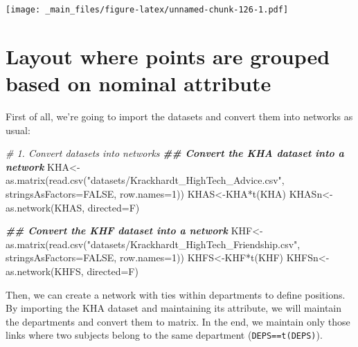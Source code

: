 \documentclass[
  notitlepage,
  onecolumn,
  openany]{book}
\newenvironment{Shaded}{\begin{snugshade}}{\end{snugshade}}
\newcommand{\AttributeTok}[1]{\textcolor[rgb]{0.77,0.63,0.00}{#1}}
\newcommand{\CommentTok}[1]{\textcolor[rgb]{0.56,0.35,0.01}{\textit{#1}}}
\newcommand{\ConstantTok}[1]{\textcolor[rgb]{0.00,0.00,0.00}{#1}}
\newcommand{\DecValTok}[1]{\textcolor[rgb]{0.00,0.00,0.81}{#1}}
\newcommand{\DocumentationTok}[1]{\textcolor[rgb]{0.56,0.35,0.01}{\textbf{\textit{#1}}}}
\newcommand{\FunctionTok}[1]{\textcolor[rgb]{0.00,0.00,0.00}{#1}}
\newcommand{\NormalTok}[1]{#1}
\newcommand{\OtherTok}[1]{\textcolor[rgb]{0.56,0.35,0.01}{#1}}
\newcommand{\SpecialCharTok}[1]{\textcolor[rgb]{0.00,0.00,0.00}{#1}}
\newcommand{\StringTok}[1]{\textcolor[rgb]{0.31,0.60,0.02}{#1}}
\begin{document}
\texttt{[image: \_main\_files/figure-latex/unnamed-chunk-126-1.pdf]}

\hypertarget{layout-where-points-are-grouped-based-on-nominal-attribute}{%
\section{Layout where points are grouped based on nominal attribute}\label{layout-where-points-are-grouped-based-on-nominal-attribute}}

First of all, we're going to import the datasets and convert them into networks as usual:

\begin{Shaded}
\begin{Highlighting}[]
\CommentTok{\# 1. Convert datasets into networks}
\DocumentationTok{\#\# Convert the KHA dataset into a network}
\NormalTok{KHA}\OtherTok{\textless{}{-}}\FunctionTok{as.matrix}\NormalTok{(}\FunctionTok{read.csv}\NormalTok{(}\StringTok{"datasets/Krackhardt\_HighTech\_Advice.csv"}\NormalTok{,}
                        \AttributeTok{stringsAsFactors=}\ConstantTok{FALSE}\NormalTok{, }\AttributeTok{row.names=}\DecValTok{1}\NormalTok{))}
\NormalTok{KHAS}\OtherTok{\textless{}{-}}\NormalTok{KHA}\SpecialCharTok{*}\FunctionTok{t}\NormalTok{(KHA)}
\NormalTok{KHASn}\OtherTok{\textless{}{-}}\FunctionTok{as.network}\NormalTok{(KHAS, }\AttributeTok{directed=}\NormalTok{F)}

\DocumentationTok{\#\# Convert the KHF dataset into a network}
\NormalTok{KHF}\OtherTok{\textless{}{-}}\FunctionTok{as.matrix}\NormalTok{(}\FunctionTok{read.csv}\NormalTok{(}\StringTok{"datasets/Krackhardt\_HighTech\_Friendship.csv"}\NormalTok{,}
                        \AttributeTok{stringsAsFactors=}\ConstantTok{FALSE}\NormalTok{, }\AttributeTok{row.names=}\DecValTok{1}\NormalTok{))}
\NormalTok{KHFS}\OtherTok{\textless{}{-}}\NormalTok{KHF}\SpecialCharTok{*}\FunctionTok{t}\NormalTok{(KHF)}
\NormalTok{KHFSn}\OtherTok{\textless{}{-}}\FunctionTok{as.network}\NormalTok{(KHFS, }\AttributeTok{directed=}\NormalTok{F)}
\end{Highlighting}
\end{Shaded}

Then, we can create a network with ties within departments to define positions. By importing the KHA dataset and maintaining its attribute, we will maintain the departments and convert them to matrix. In the end, we maintain only those links where two subjects belong to the same department (\texttt{DEPS==t(DEPS)}).
\end{document}
